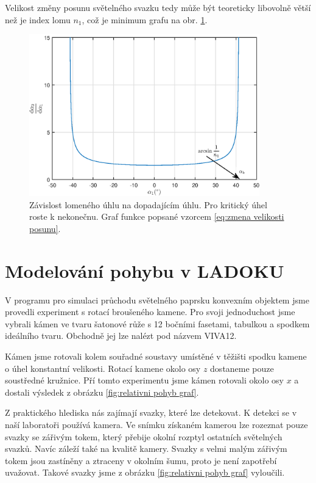 Velikost změny posunu světelného svazku tedy může být teoreticky libovolně větší než je index lomu $n_1$, což je minimum grafu na obr. \ref{fig:derivace uhlu}. 

\begin{figure}
\begin{center}
\includegraphics[width = 10cm]{figures/derivace.eps}
\end{center}
\caption{Závislost lomeného úhlu na dopadajícím úhlu. Pro kritický úhel roste k nekonečnu. Graf funkce popsané vzorcem \ref{eq:zmena velikosti posunu}.}
\label{fig:derivace uhlu}
\end{figure}
\newpage


\section*{Modelování pohybu v LADOKU}

V programu pro simulaci průchodu světelného paprsku konvexním objektem jsme provedli experiment s rotací broušeného kamene. Pro svoji jednoduchost jsme vybrali kámen ve tvaru šatonové růže s 12 bočními fasetami, tabulkou a spodkem ideálního tvaru. Obchodně jej lze nalézt pod názvem VIVA12.

Kámen jsme rotovali kolem souřadné soustavy umístěné v těžišti spodku kamene o úhel konstantní velikosti. Rotací kamene okolo osy $z$ dostaneme pouze soustředné kružnice. Pří tomto experimentu jsme kámen rotovali okolo osy $x$ a dostali výsledek z obrázku \ref{fig:relativni pohyb graf}.

Z praktického hlediska nás zajímají svazky, které lze detekovat. K detekci se v naší laboratoři používá kamera. Ve snímku získaném kamerou lze rozeznat pouze svazky se zářivým tokem, který přebije okolní rozptyl ostatních světelných svazků. Navíc záleží také na kvalitě kamery. Svazky s velmi malým zářivým tokem jsou zastíněny a ztraceny v okolním šumu, proto je není zapotřebí uvažovat. Takové svazky jsme z obrázku \ref{fig:relativni pohyb graf} vyloučili. 

